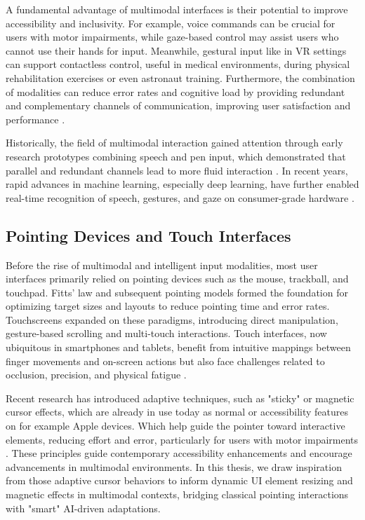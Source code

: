\documentclass[openany]{book}
\begin{document}
A fundamental advantage of multimodal interfaces is their potential to improve accessibility and inclusivity. For example, voice commands can be crucial for users with motor impairments, while gaze-based control may assist users who cannot use their hands for input. Meanwhile, gestural input like in VR settings can support contactless control, useful in medical environments, during physical rehabilitation exercises or even astronaut training. Furthermore, the combination of modalities can reduce error rates and cognitive load by providing redundant and complementary channels of communication, improving user satisfaction and performance \cite{10.1145/319382.319398}.


Historically, the field of multimodal interaction gained attention through early research prototypes combining speech and pen input, which demonstrated that parallel and redundant channels lead to more fluid interaction \cite{10.1145/319382.319398, Oviatt2004}. In recent years, rapid advances in machine learning, especially deep learning, have further enabled real-time recognition of speech, gestures, and gaze on consumer-grade hardware \cite{lugaresi2019mediapipeframeworkbuildingperception, Choudhury2015}.

\subsection{Pointing Devices and Touch Interfaces}
Before the rise of multimodal and intelligent input modalities, most user interfaces primarily relied on pointing devices such as the mouse, trackball, and touchpad. Fitts' law \cite{Fitts1954} and subsequent pointing models formed the foundation for optimizing target sizes and layouts to reduce pointing time and error rates.  
Touchscreens expanded on these paradigms, introducing direct manipulation, gesture-based scrolling and multi-touch interactions. Touch interfaces, now ubiquitous in smartphones and tablets, benefit from intuitive mappings between finger movements and on-screen actions but also face challenges related to occlusion, precision, and physical fatigue \cite{Wigdor2011BraveNUI}.

Recent research has introduced adaptive techniques, such as "sticky" or magnetic cursor effects, which are already in use today as normal or accessibility features on for example Apple devices. Which help guide the pointer toward interactive elements, reducing effort and error, particularly for users with motor impairments \cite{Cockburn2008Sticky}. These principles guide contemporary accessibility enhancements and encourage advancements in multimodal environments.
In this thesis, we draw inspiration from those adaptive cursor behaviors to inform dynamic UI element resizing and magnetic effects in multimodal contexts, bridging classical pointing interactions with "smart" AI-driven adaptations.
\end{document}
